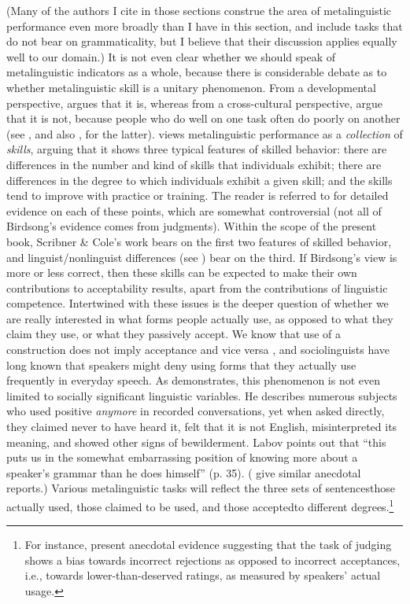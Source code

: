(Many of the authors I cite in those sections construe the area of metalinguistic performance even more broadly than I have in this section, and include tasks that do not bear on grammaticality, but I believe that their discussion applies equally well to our domain.) It is not even clear whether we should speak of metalinguistic indicators as a whole, because there is considerable debate as to whether metalinguistic skill is a unitary phenomenon. From a developmental perspective, \citet{Hakes1980} argues that it is, whereas from a cross-cultural perspective, \citet{ScribnerEtAl1981} argue that it is not, because people who do well on one task often do poorly on another (see , and also , for the latter). \citet{Birdsong1989} views metalinguistic performance as a \textit{collection} of \textit{skills}, arguing that it shows three typical features of skilled behavior: there are differences in the number and kind of skills that individuals exhibit; there are differences in the degree to which individuals exhibit a given skill; and the skills tend to improve with practice or training. The reader is referred to \citet[51\textendash{}54]{Birdsong1989} for detailed evidence on each of these points, which are somewhat controversial (not all of Birdsong's evidence comes from judgments). Within the scope of the present book, Scribner \& Cole's work bears on the first two features of skilled behavior, and linguist/nonlinguist differences (see ) bear on the third. If Birdsong's view is more or less correct, then these skills can be expected to make their own contributions to acceptability results, apart from the contributions of linguistic competence. Intertwined with these issues is the deeper question of whether we are really interested in what forms people actually use, as opposed to what they claim they use, or what they passively accept. We know that use of a construction does not imply acceptance and vice versa \citep{Greenbaum1976a}, and sociolinguists have long known that speakers might deny using forms that they actually use frequently in everyday speech. As \citet{Labov1975} demonstrates, this phenomenon is not even limited to socially significant linguistic variables. He describes numerous subjects who used positive \textit{anymore} in recorded conversations, yet when asked directly, they claimed never to have heard it, felt that it is not English, misinterpreted its meaning, and showed other signs of bewilderment. Labov points out that ``this puts us in the somewhat embarrassing position of knowing more about a speaker's grammar than he does himself'' (p. 35). (\citet{HindleEtAl1975} give similar anecdotal reports.) Various metalinguistic tasks will reflect the three sets of sentences\schdash{}those actually used, those claimed to be used, and those accepted\schdash{}to different degrees.\footnote{For instance, \citet{HindleEtAl1975} present anecdotal evidence suggesting that the task of judging shows a bias towards incorrect rejections as opposed to incorrect acceptances, i.e., towards lower-than-deserved ratings, as measured by speakers' actual usage.}
